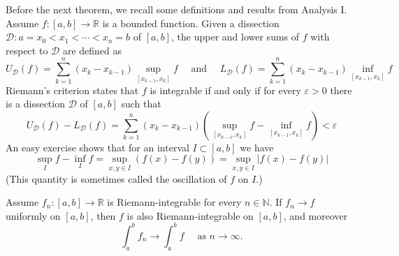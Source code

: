 \documentclass[a4paper,11pt]{article}
\begin{document}
Before the next theorem, we recall some definitions and results from Analysis I. Assume $f:[a, b] \rightarrow \mathbb{R}$ is a bounded function. Given a dissection $\mathcal{D}: a=x_{0}<x_{1}<\cdots<x_{n}=b$ of $[a, b]$, the upper and lower sums of $f$ with respect to $\mathcal{D}$ are defined as
\[
U_{\mathcal{D}}(f)=\sum_{k=1}^{n}\left(x_{k}-x_{k-1}\right) \sup _{\left[x_{k-1}, x_{k}\right]} f \quad \text { and } \quad L_{\mathcal{D}}(f)=\sum_{k=1}^{n}\left(x_{k}-x_{k-1}\right) \inf _{\left[x_{k-1}, x_{k}\right]} f
\]
Riemann's criterion states that $f$ is integrable if and only if for every $\varepsilon>0$ there is a dissection $\mathcal{D}$ of $[a, b]$ such that
\[
U_{\mathcal{D}}(f)-L_{\mathcal{D}}(f)=\sum_{k=1}^{n}\left(x_{k}-x_{k-1}\right)\left(\sup _{\left[x_{k-1}, x_{k}\right]} f-\inf _{\left[x_{k-1}, x_{k}\right]} f\right)<\varepsilon
\]
An easy exercise shows that for an interval $I \subset[a, b]$ we have
\[
\sup _{I} f-\inf _{I} f=\sup _{x, y \in I}(f(x)-f(y))=\sup _{x, y \in I}|f(x)-f(y)|
\]
(This quantity is sometimes called the oscillation of $f$ on $I$.)

\begin{theorem}\label{theorem 3}
    Assume $f_{n}:[a, b] \rightarrow \mathbb{R}$ is Riemann-integrable for every $n \in \mathbb{N}$. If $f_{n} \rightarrow f$ uniformly on $[a, b]$, then $f$ is also Riemann-integrable on $[a, b]$, and moreover
    \[
    \int_{a}^{b} f_{n} \rightarrow \int_{a}^{b} f \quad \text { as } n \rightarrow \infty.
    \]
\end{theorem}
\end{document}
